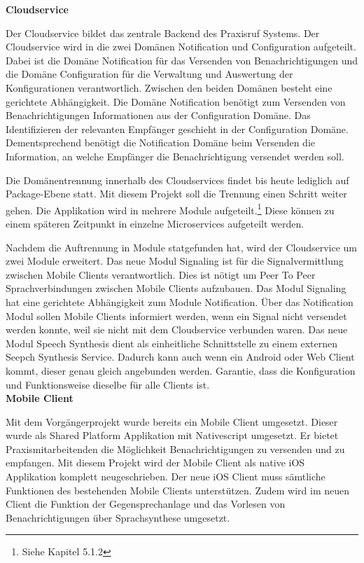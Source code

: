 \textbf{Cloudservice}

Der Cloudservice bildet das zentrale Backend des Praxisruf Systems.
Der Cloudservice wird in die zwei Domänen Notification und Configuration aufgeteilt.
Dabei ist die Domäne Notification für das Versenden von Benachrichtigungen und die Domäne Configuration für die Verwaltung und Auswertung der Konfigurationen verantwortlich.
Zwischen den beiden Domänen besteht eine gerichtete Abhängigkeit.
Die Domäne Notification benötigt zum Versenden von Benachrichtigungen Informationen aus der Configuration Domäne.
Das Identifizieren der relevanten Empfänger geschieht in der Configuration Domäne.
Dementsprechend benötigt die Notification Domäne beim Versenden die Information, an welche Empfänger die Benachrichtigung versendet werden soll.

Die Domänentrennung innerhalb des Cloudservices findet bis heute lediglich auf Package-Ebene statt.
Mit diesem Projekt soll die Trennung einen Schritt weiter gehen.
Die Applikation wird in mehrere Module aufgeteilt.\footnote{Siehe Kapitel 5.1.2}
Diese können zu einem späteren Zeitpunkt in einzelne Microservices aufgeteilt werden.

Nachdem die Auftrennung in Module statgefunden hat, wird der Cloudservice um zwei Module erweitert.
Das neue Modul Signaling ist für die Signalvermittlung zwischen Mobile Clients verantwortlich.
Dies ist nötigt um Peer To Peer Sprachverbindungen zwischen Mobile Clients aufzubauen.
Das Modul Signaling hat eine gerichtete Abhängigkeit zum Module Notification.
Über das Notification Modul sollen Mobile Clients informiert werden, wenn ein Signal nicht versendet werden konnte, weil sie nicht mit dem Cloudservice verbunden waren.
Das neue Modul Speech Synthesis dient als einheitliche Schnittstelle zu einem externen Seepch Synthesis Service.
Dadurch kann auch wenn ein Android oder Web Client kommt, dieser genau gleich angebunden werden.
Garantie, dass die Konfiguration und Funktionsweise dieselbe für alle Clients ist. \\

\textbf{Mobile Client}

Mit dem Vorgängerprojekt wurde bereits ein Mobile Client umgesetzt.
Dieser wurde als Shared Platform Applikation mit Nativescript umgesetzt.
Er bietet Praxismitarbeitenden die Möglichkeit Benachrichtigungen zu versenden und zu empfangen.
Mit diesem Projekt wird der Mobile Client als native iOS Applikation komplett neugeschrieben.
Der neue iOS Client muss sämtliche Funktionen des bestehenden Mobile Clients unterstützen.
Zudem wird im neuen Client die Funktion der Gegensprechanlage und das Vorlesen von Benachrichtigungen über Sprachsynthese umgesetzt.

